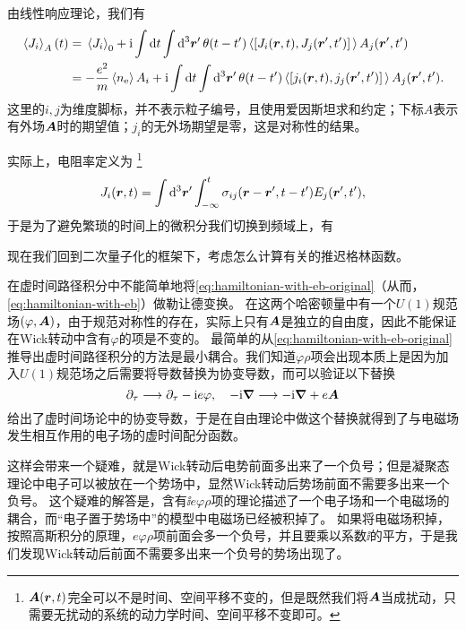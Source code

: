 由线性响应理论，我们有
\[
    \begin{aligned}
        \expval*{{J}_i}_A (t) &= \expval*{{J}_i}_0 + \ii \int \dd{t} \int \dd[3]{\vb*{r}'} \theta(t-t') \expval*{\comm*{{J}_i(\vb*{r}, t)}{{J}_j(\vb*{r}', t')}} A_j(\vb*{r}', t') \\
        &= - \frac{e^2}{m} \expval*{{n}_\text{e}} A_i + \ii \int \dd{t} \int \dd[3]{\vb*{r}'} \theta(t-t') \expval*{\comm*{{j}_i(\vb*{r}, t)}{{j}_j(\vb*{r}', t')}} A_j(\vb*{r}', t').
    \end{aligned}
\]
这里的$i, j$为维度脚标，并不表示粒子编号，且使用爱因斯坦求和约定；下标$A$表示有外场$\vb*{A}$时的期望值；${j}_i$的无外场期望是零，这是对称性的结果。

实际上，电阻率定义为%
\footnote{$\vb*{A}(\vb*{r}, t)$完全可以不是时间、空间平移不变的，但是既然我们将$\vb*{A}$当成扰动，只需要无扰动的系统的动力学时间、空间平移不变即可。}%
\begin{equation}
    J_i(\vb*{r}, t) = \int \dd[3]{\vb*{r}'} \int_{-\infty}^t \sigma_{ij}(\vb*{r}-\vb*{r}', t - t') E_j(\vb*{r}', t'),
\end{equation}
于是为了避免繁琐的时间上的微积分我们切换到频域上，有

现在我们回到二次量子化的框架下，考虑怎么计算有关的推迟格林函数。

在虚时间路径积分中不能简单地将\eqref{eq:hamiltonian-with-eb-original}（从而，\eqref{eq:hamiltonian-with-eb}）做勒让德变换。
在这两个哈密顿量中有一个$U(1)$规范场$(\varphi, \vb*{A})$，由于规范对称性的存在，实际上只有$\vb*{A}$是独立的自由度，因此不能保证在Wick转动中含有$\varphi$的项是不变的。
最简单的从\eqref{eq:hamiltonian-with-eb-original}推导出虚时间路径积分的方法是最小耦合。我们知道$\varphi \rho$项会出现本质上是因为加入$U(1)$规范场之后需要将导数替换为协变导数，而可以验证以下替换
\begin{equation}
    \partial_\tau \longrightarrow \partial_\tau - \mathrm{i} e \varphi, \quad - \mathrm{i} \grad \longrightarrow - \mathrm{i} \grad + e \vb*{A} 
    \label{eq:imaginary-em-covariant-derivative}
\end{equation}
给出了虚时间场论中的协变导数，于是在自由理论中做这个替换就得到了与电磁场发生相互作用的电子场的虚时间配分函数。

这样会带来一个疑难，就是Wick转动后电势前面多出来了一个负号；但是凝聚态理论中电子可以被放在一个势场中，显然Wick转动后势场前面不需要多出来一个负号。
这个疑难的解答是，含有$\ii e \varphi \rho$项的理论描述了一个电子场和一个电磁场的耦合，而“电子置于势场中”的模型中电磁场已经被积掉了。
如果将电磁场积掉，按照高斯积分的原理，$e \varphi \rho$项前面会多一个负号，并且要乘以系数$\ii$的平方，于是我们发现Wick转动后前面不需要多出来一个负号的势场出现了。

